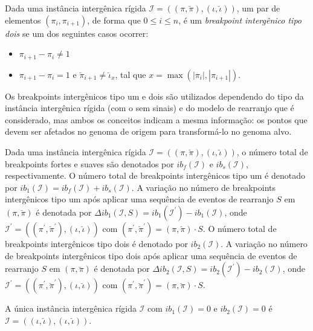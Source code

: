 \begin{definition}
  Dada uma instância intergênica rígida $\mathcal{I} = ((\pi,\breve\pi),(\iota,\breve\iota))$, um par de elementos $(\pi_{i}, \pi_{i+1})$, de forma que $0 \le i \le n$, é um \emph{breakpoint intergênico tipo dois} se um dos seguintes casos ocorrer:
  \begin{itemize}
    \item $\pi_{i+1} - \pi_{i} \ne 1$
    \item $\pi_{i+1} - \pi_{i} = 1$ e $\breve\pi_{i+1} \ne \breve\iota_{x}$, tal que $x = \max(|\pi_{i}|, |\pi_{i+1}|)$.
  \end{itemize}
\end{definition}

Os breakpoints intergênicos tipo um e dois são utilizados dependendo do tipo da instância intergênica rígida (com o sem sinais) e do modelo de rearranjo que é considerado, mas ambos os conceitos indicam a mesma informação: os pontos que devem ser afetados no genoma de origem para transformá-lo no genoma alvo.

Dada uma instância intergênica rígida $\mathcal{I} = ((\pi,\breve\pi),(\iota,\breve\iota))$, o número total de breakpoints fortes e suaves são denotados por $ib_f(\mathcal{I})$ e $ib_s(\mathcal{I})$, respectivamente. O número total de breakpoints intergênicos tipo um é denotado por $ib_{1}(\mathcal{I}) = ib_f(\mathcal{I}) + ib_s(\mathcal{I})$. A variação no número de breakpoints intergênicos tipo um após aplicar uma sequência de eventos de rearranjo $S$ em $(\pi,\breve\pi)$ é denotada por  $\Delta ib_1(\mathcal{I},S) = ib_1(\mathcal{I}^{\prime}) - ib_1(\mathcal{I})$, onde $\mathcal{I}^{\prime} = ((\pi^{\prime}, \breve\pi^{\prime}),(\iota,\breve\iota))$ com $(\pi^{\prime}, \breve\pi^{\prime}) = (\pi, \breve\pi) \cdot S$. O número total de breakpoints intergênicos tipo dois é denotado por $ib_{2}(\mathcal{I})$. A variação no número de breakpoints intergênicos tipo dois após aplicar uma sequência de eventos de rearranjo $S$ em $(\pi,\breve\pi)$ é denotada por  $\Delta ib_2(\mathcal{I},S) = ib_2(\mathcal{I}^{\prime}) - ib_2(\mathcal{I})$, onde $\mathcal{I}^{\prime} = ((\pi^{\prime}, \breve\pi^{\prime}),(\iota,\breve\iota))$ com $(\pi^{\prime}, \breve\pi^{\prime}) = (\pi, \breve\pi) \cdot S$.

\begin{remark}\label{remark:UDYJTHAH}
  A única instância intergênica rígida $\mathcal{I}$ com $ib_1(\mathcal{I}) = 0$ e $ib_2(\mathcal{I}) = 0$ é $\mathcal{I} = ((\iota,\breve\iota),(\iota,\breve\iota))$.
\end{remark}


